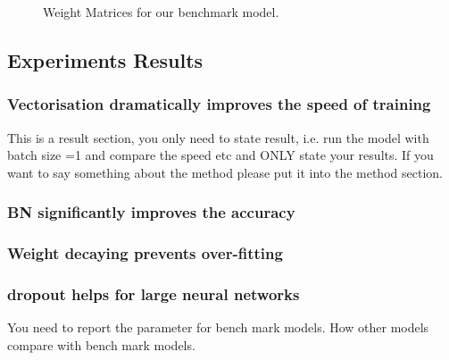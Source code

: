 \begin{figure}
    \caption{\label{fig:my-label3}Weight Matrices for our benchmark model.}
\end{figure}


\subsection{Experiments Results}

\subsubsection{Vectorisation dramatically improves the speed of training}
This is a result section, you only need to state result, i.e. run the model with batch size =1 and compare the speed etc and ONLY state your results. If you want to say something about the method please put it into the method section.

\subsubsection{BN significantly improves the accuracy}


\subsubsection{Weight decaying prevents over-fitting}


\subsubsection{dropout helps for large neural networks}

You need to report the parameter for bench mark models.
How other models compare with bench mark models.